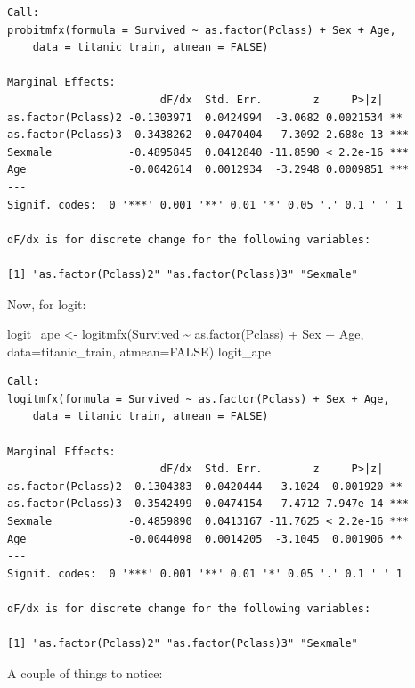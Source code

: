 \documentclass[
  letterpaper,
  DIV=11,
  numbers=noendperiod]{scrreprt}
\newenvironment{Shaded}{\begin{snugshade}}{\end{snugshade}}
\newcommand{\AttributeTok}[1]{\textcolor[rgb]{0.40,0.45,0.13}{#1}}
\newcommand{\ConstantTok}[1]{\textcolor[rgb]{0.56,0.35,0.01}{#1}}
\newcommand{\FunctionTok}[1]{\textcolor[rgb]{0.28,0.35,0.67}{#1}}
\newcommand{\NormalTok}[1]{\textcolor[rgb]{0.00,0.23,0.31}{#1}}
\newcommand{\OtherTok}[1]{\textcolor[rgb]{0.00,0.23,0.31}{#1}}
\newcommand{\SpecialCharTok}[1]{\textcolor[rgb]{0.37,0.37,0.37}{#1}}
\begin{document}
\begin{verbatim}
Call:
probitmfx(formula = Survived ~ as.factor(Pclass) + Sex + Age, 
    data = titanic_train, atmean = FALSE)

Marginal Effects:
                        dF/dx  Std. Err.        z     P>|z|    
as.factor(Pclass)2 -0.1303971  0.0424994  -3.0682 0.0021534 ** 
as.factor(Pclass)3 -0.3438262  0.0470404  -7.3092 2.688e-13 ***
Sexmale            -0.4895845  0.0412840 -11.8590 < 2.2e-16 ***
Age                -0.0042614  0.0012934  -3.2948 0.0009851 ***
---
Signif. codes:  0 '***' 0.001 '**' 0.01 '*' 0.05 '.' 0.1 ' ' 1

dF/dx is for discrete change for the following variables:

[1] "as.factor(Pclass)2" "as.factor(Pclass)3" "Sexmale"           
\end{verbatim}

Now, for logit:

\begin{Shaded}
\begin{Highlighting}[]
\NormalTok{logit\_ape }\OtherTok{\textless{}{-}} \FunctionTok{logitmfx}\NormalTok{(Survived }\SpecialCharTok{\textasciitilde{}} \FunctionTok{as.factor}\NormalTok{(Pclass) }\SpecialCharTok{+}\NormalTok{ Sex }\SpecialCharTok{+}\NormalTok{ Age, }
                        \AttributeTok{data=}\NormalTok{titanic\_train, }
                        \AttributeTok{atmean=}\ConstantTok{FALSE}\NormalTok{)}
\NormalTok{logit\_ape}
\end{Highlighting}
\end{Shaded}

\begin{verbatim}
Call:
logitmfx(formula = Survived ~ as.factor(Pclass) + Sex + Age, 
    data = titanic_train, atmean = FALSE)

Marginal Effects:
                        dF/dx  Std. Err.        z     P>|z|    
as.factor(Pclass)2 -0.1304383  0.0420444  -3.1024  0.001920 ** 
as.factor(Pclass)3 -0.3542499  0.0474154  -7.4712 7.947e-14 ***
Sexmale            -0.4859890  0.0413167 -11.7625 < 2.2e-16 ***
Age                -0.0044098  0.0014205  -3.1045  0.001906 ** 
---
Signif. codes:  0 '***' 0.001 '**' 0.01 '*' 0.05 '.' 0.1 ' ' 1

dF/dx is for discrete change for the following variables:

[1] "as.factor(Pclass)2" "as.factor(Pclass)3" "Sexmale"           
\end{verbatim}

A couple of things to notice:
\end{document}
